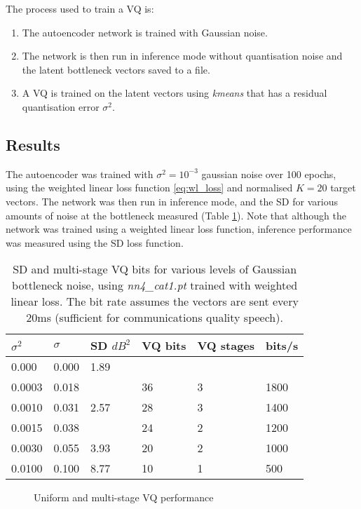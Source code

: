 \documentclass{article}
\begin{document}
The process used to train a VQ is:
\begin{enumerate}
\item The autoencoder network is trained with Gaussian noise.
\item The network is then run in inference mode without quantisation noise and the latent bottleneck vectors saved to a file.
\item A VQ is trained on the latent vectors using \emph{kmeans} that has a residual quantisation error $\sigma^2$.
\end{enumerate}

\subsection{Results}

The autoencoder was trained with $\sigma^2=10^{-3}$ gaussian noise over 100 epochs, using the weighted linear loss function \ref{eq:wl_loss} and normalised $K=20$ target vectors.  The network was then run in inference mode, and the SD for various amounts of noise at the bottleneck measured (Table \ref{tab:nn4_inference}).  Note that although the network was trained using a weighted linear loss function, inference performance was measured using the SD loss function.

\begin{table}
\label{tab:nn4_inference}
\centering
\begin{tabular}{l l l l l l}
\hline
$\sigma^2$ & $\sigma$ & SD $dB^2$ & VQ bits & VQ stages & bits/s \\
\hline
0.000  & 0.000 & 1.89 \\
0.0003 & 0.018 &      & 36 & 3 & 1800 \\
0.0010 & 0.031 & 2.57 & 28 & 3 & 1400 \\
0.0015 & 0.038 &      & 24 & 2 & 1200 \\
0.0030 & 0.055 & 3.93 & 20 & 2 & 1000 \\
0.0100 & 0.100 & 8.77 & 10 & 1 & 500 \\
\hline
\end{tabular}
\caption{SD and multi-stage VQ bits for various levels of Gaussian bottleneck noise, using \emph{nn4\_cat1.pt} trained with weighted linear loss.  The bit rate assumes the vectors are sent every 20ms (sufficient for communications quality speech). }
\end{table}

\begin{figure}
\caption{Uniform and multi-stage VQ performance}
\label{fig:uniform_vq}
\begin{center}

\end{center}
\end{figure}
\end{document}
